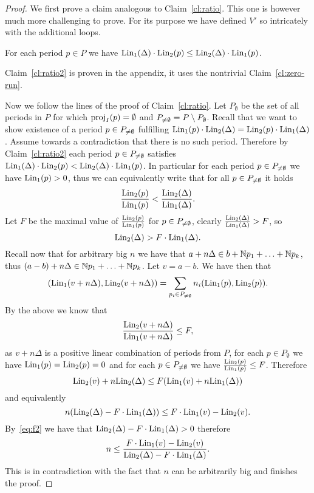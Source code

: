 \begin{proof}
We first prove a claim analogous to Claim~\ref{cl:ratio}.
This one is however much more challenging to prove. For its purpose we have defined $V'$ so intricately
with the additional loops.

\begin{claim}\label{cl:ratio2}
For each period $p \in P$ we have $\textup{Lin}_1(\Delta) \cdot \textup{Lin}_2(p) \leq \textup{Lin}_2(\Delta) \cdot \textup{Lin}_1(p)$.
\end{claim}

Claim~\ref{cl:ratio2} is proven in the appendix, it uses the nontrivial Claim~\ref{cl:zero-run}.

Now we follow the lines of the proof of Claim~\ref{cl:ratio}.
Let $P_\emptyset$ be the set of all periods in $P$ for which $\textup{proj}_I(p) = \emptyset$
and $P_{\neq\emptyset} = P \setminus P_\emptyset$.
Recall that we want to show existence of a period $p \in P_{\neq\emptyset}$ fulfilling $\textup{Lin}_1(p) \cdot \textup{Lin}_2(\Delta) = \textup{Lin}_2(p) \cdot \textup{Lin}_1(\Delta)$.
Assume towards a contradiction that there is no such period.
Therefore by Claim~\ref{cl:ratio2} each period $p \in P_{\neq\emptyset}$ satisfies $\textup{Lin}_1(\Delta) \cdot \textup{Lin}_2(p) < \textup{Lin}_2(\Delta) \cdot \textup{Lin}_1(p)$.
In particular for each period $p \in P_{\neq\emptyset}$ we have $\textup{Lin}_1(p) > 0$,
thus we can equivalently write that for all $p \in P_{\neq\emptyset}$ it holds
\[
\frac{\textup{Lin}_2(p)}{\textup{Lin}_1(p)} < \frac{\textup{Lin}_2(\Delta)}{\textup{Lin}_1(\Delta)}.
\]
Let $F$ be the maximal value of $\frac{\textup{Lin}_2(p)}{\textup{Lin}_1(p)}$ for $p \in P_{\neq\emptyset}$,
clearly $\frac{\textup{Lin}_2(\Delta)}{\textup{Lin}_1(\Delta)} > F$, so
\begin{equation}\label{eq:f2}
\textup{Lin}_2(\Delta) > F \cdot \textup{Lin}_1(\Delta).
\end{equation}
Recall now that for arbitrary big $n$ we have that $a + n\Delta \in b + \mathbb{N} p_1 + \ldots + \mathbb{N} p_k$,
thus $(a - b) + n\Delta \in \mathbb{N} p_1 + \ldots + \mathbb{N} p_k$. Let $v = a - b$.
We have then that
\[
(\textup{Lin}_1(v+n\Delta), \textup{Lin}_2(v+n\Delta)) = \sum_{p_i \in P_{\neq\emptyset}} n_i (\textup{Lin}_1(p), \textup{Lin}_2(p)).
\]
By the above we know that
\[
\frac{\textup{Lin}_2(v+n\Delta)}{\textup{Lin}_1(v+n\Delta)} \leq F,
\]
as $v+n\Delta$ is a positive linear combination of periods from $P$,
for each $p \in P_\emptyset$ we have $\textup{Lin}_1(p) = \textup{Lin}_2(p) = 0$ and for each $p \in P_{\neq\emptyset}$
we have $\frac{\textup{Lin}_2(p)}{\textup{Lin}_1(p)} \leq F$.
Therefore
\[
\textup{Lin}_2(v) + n \textup{Lin}_2(\Delta) \leq F(\textup{Lin}_1(v) + n \textup{Lin}_1(\Delta))
\]
and equivalently
\[
n (\textup{Lin}_2(\Delta) - F \cdot \textup{Lin}_1(\Delta)) \leq F \cdot \textup{Lin}_1(v) - \textup{Lin}_2(v).
\]
By~\eqref{eq:f2} we have that $\textup{Lin}_2(\Delta) - F \cdot \textup{Lin}_1(\Delta) > 0$ therefore
\[
n \leq \frac{F \cdot \textup{Lin}_1(v) - \textup{Lin}_2(v)}{\textup{Lin}_2(\Delta) - F \cdot \textup{Lin}_1(\Delta)}.
\]
This is in contradiction with the fact that $n$ can be arbitrarily big
and finishes the proof.
\end{proof}

